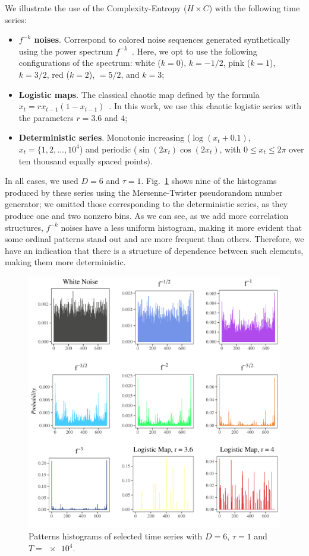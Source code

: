 We illustrate the use of the Complexity-Entropy ($H\times C$) with the following time series:
\begin{itemize}
    \item \textbf{$f^{-k}$ noises}. Correspond to colored noise sequences generated synthetically using the power spectrum $f^{-k}$~\citep{DistinguishingNoiseFromChaos}.
    Here, we opt to use the following configurations of the spectrum: white ($k=0$), $k=-1/2$, pink ($k=1$), $k=3/2$, red ($k=2$), $=5/2$, and $k=3$;
    \item \textbf{Logistic maps}. The classical chaotic map defined by the formula $x_t = r x_{t-1} (1 - x_{t-1})$~\citep{peitgen2006chaos}.
    In this work, we use this chaotic logistic series with the parameters $r = 3.6$ and $4$;
    \item \textbf{Deterministic series}. Monotonic increasing ($\log(x_t+0.1)$, $x_t=\{1,2,\dots,10^4$) and periodic ($\sin(2x_t)\cos(2x_t)$, with $0\leq x_t\leq 2\pi$ over ten thousand equally spaced points).
\end{itemize}
In all cases, we used $D=6$ and $\tau=1$.
Fig.~\ref{fig:Histograms} shows nine of the histograms produced by these series using the Mersenne-Twister pseudorandom number generator;
we omitted those corresponding to the deterministic series, as they produce one and two nonzero bins.
As we can see, as we add more correlation structures, $f^{-k}$ noises have a less uniform histogram, making it more evident that some ordinal patterns stand out and are more frequent than others.
Therefore, we have an indication that there is a structure of dependence between such elements, making them more deterministic.

\begin{figure}
    \includegraphics[width=\linewidth]{Figures/h.pdf}
	\caption{Patterns histograms of selected time series with $D=6$, $\tau=1$ and $T = \num[scientific-notation=true]{e4}$.}
	\label{fig:Histograms}
\end{figure}

